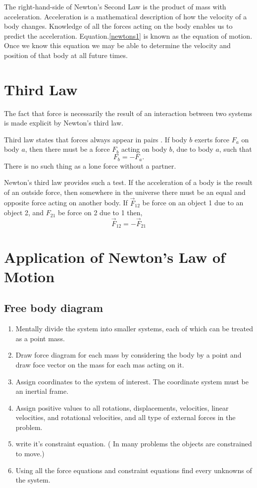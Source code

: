 The right-hand-side of Newton's Second Law is the product of mass with acceleration. Acceleration is a mathematical description of how the velocity of a body changes. Knowledge of all the forces acting on the body enables us to predict the acceleration. Equation.\ref{newtons1} is known as the equation of motion. Once we know this equation we may be able to determine the velocity and position of that body at all future times. 
\section{Third Law}
The fact that force is necessarily the result of an interaction between two systems is made explicit by Newton's third law. 
\begin{definition}
	Third law states that forces always appear in pairs . If body $b$ exerts force ${F}_{a}$ on body $a$, then there must be a force ${F}_{b}$ acting on body $b$, due to body $a$, such that $${F}_{b}=-{F}_{a} .$$ There is no such thing as a lone force without a partner.
\end{definition}
Newton's third law provides such a test. If the acceleration of a body is the result of an outside force, then somewhere in the universe there must be an equal and opposite force acting on another body.   If $\vec{F}_{12}$ be force on an object 1 due to an object 2, and $F_{21}$ be force on 2 due to 1 then,
$$
\vec{F}_{12}=-\vec{F}_{21}
$$
\section{Application of Newton’s Law of Motion}
\subsection{Free body diagram}
\begin{enumerate}
	\item Mentally divide the system into smaller systems, each of which can be treated as a point mass.
	\item Draw force diagram for each mass by considering the body by a point  and draw foce vector on the mass for each mas acting on it.
	\item Assign coordinates to the system of interest. The coordinate system must be an inertial frame.
	\item Assign positive values to all rotations, displacements, velocities, linear velocities, and rotational velocities, and all type of external forces in the problem.
	\item write it's  constraint equation. ( In many problems the objects are constrained to move.)
	\item Using all the force equations and constraint equations find every unknowns of the system.
\end{enumerate}
